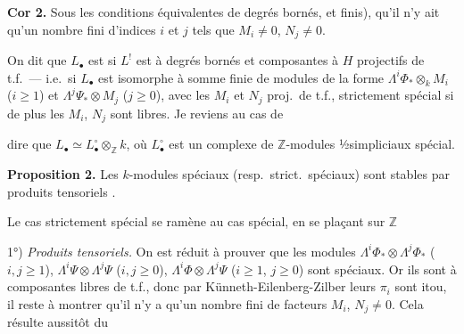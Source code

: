 \documentclass[11pt,a4paper]{article}
\begin{document}
\textbf{Cor 2.} Sous les conditions équivalentes de \ill{}
\struck{\ill{}} \ill{} degrés bornés, et finis), qu'il
n'y ait qu'un nombre fini d'indices $i$ et $j$ tels que $M_{i} \neq 0$,
$N_{j} \neq 0$.

 On dit que $L_{\bullet}$ est
  si $L^{!}$ est à degrés bornés et
composantes \ill{} à $H$ projectifs de t.f.\ — i.e.\ si $L_{\bullet}$ est
isomorphe à somme finie de modules de la forme $\Lambda^{i}\Phi_{*} \otimes_{k}
M_{i}$ ($i \geqslant 1$) et $\Lambda^{j}\Psi_{*} \otimes M_{j}$ ($j
\geqslant 0$), avec les $M_{i}$ et $N_{j}$ proj.\ de t.f., strictement
spécial si de plus les $M_{i}$, $N_{j}$ sont libres. Je reviens au cas de

dire que $L_{\bullet} \simeq L^{\circ}_{\bullet} \otimes_{\mathbb{Z}} k$, où
$L^{\circ}_{\bullet}$ est un complexe de $\mathbb{Z}$-modules ½simpliciaux
spécial.

\textbf{Proposition 2.} Les $k$-modules  spéciaux
(resp.\ strict.\ spéciaux) sont stables par produits tensoriels
.\marginal{\ill{}}

Le cas strictement spécial se ramène au cas spécial, en se plaçant sur
$\mathbb{Z}$ \ill{}

1°) \emph{Produits tensoriels.} On est réduit à prouver que les modules
$\Lambda^{i}\Phi_{*} \otimes \Lambda^{j}\Phi_{*}$ ($i, j \geqslant 1$),
$\Lambda^{i}\Psi \otimes \Lambda^{j}\Psi$ ($i, j \geqslant 0$),
$\Lambda^{i}\Phi \otimes \Lambda^{j}\Psi$ ($i \geqslant 1$, $j \geqslant 0$)
sont spéciaux. Or ils sont à composantes libres de t.f., donc par
Künneth-Eilenberg-Zilber leurs $\pi_{i}$ sont itou, il reste à montrer qu'il
n'y a qu'un nombre fini de facteurs $M_{i}$, $N_{j} \neq 0$.
 Cela résulte \struck{\ill{}} aussitôt du

\end{document}

